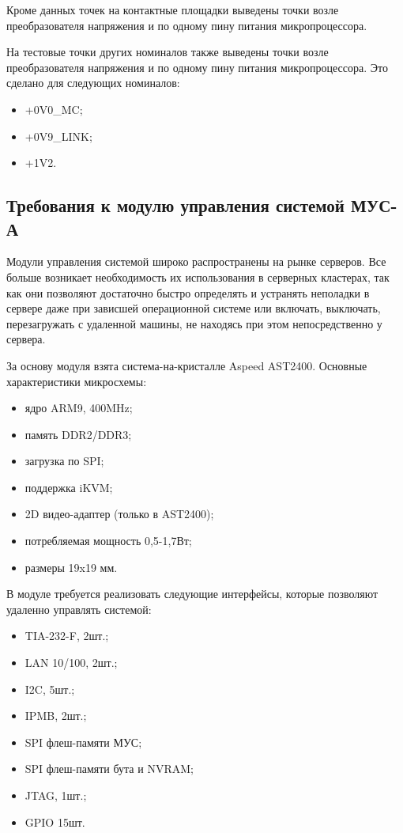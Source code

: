 Кроме данных точек на контактные площадки выведены точки возле преобразователя напряжения и по одному пину питания микропроцессора.

На тестовые точки других номиналов также выведены точки возле преобразователя напряжения и по одному пину питания микропроцессора. Это сделано для следующих номиналов:

\begin{itemize}
	\item +0V0\_MC;
	\item +0V9\_LINK;
	\item +1V2.
\end{itemize}

\subsection{Требования к модулю управления системой МУС-А}

Модули управления системой широко распространены на рынке серверов. Все больше возникает необходимость их использования в серверных кластерах, так как они позволяют достаточно быстро определять и устранять неполадки в сервере даже при зависшей операционной системе или включать, выключать, перезагружать с удаленной машины, не находясь при этом непосредственно у сервера.

За основу модуля взята система-на-кристалле Aspeed AST2400. Основные характеристики микросхемы:

\begin{itemize}
	\item ядро ARM9, 400MHz;
	\item память DDR2/DDR3;
	\item загрузка по SPI;
	\item поддержка iKVM;
	\item 2D видео-адаптер (только в AST2400);
	\item потребляемая мощность 0,5-1,7Вт;
	\item размеры 19x19 мм.
\end{itemize}

В модуле требуется реализовать следующие интерфейсы, которые позволяют удаленно управлять системой:

\begin{itemize}
	\item TIA-232-F, 2шт.;
	\item LAN 10/100, 2шт.;
	\item I2C, 5шт.;
	\item IPMB, 2шт.;
	\item SPI флеш-памяти МУС;
	\item SPI флеш-памяти бута и NVRAM;
	\item JTAG, 1шт.;
	\item GPIO 15шт.
\end{itemize}


